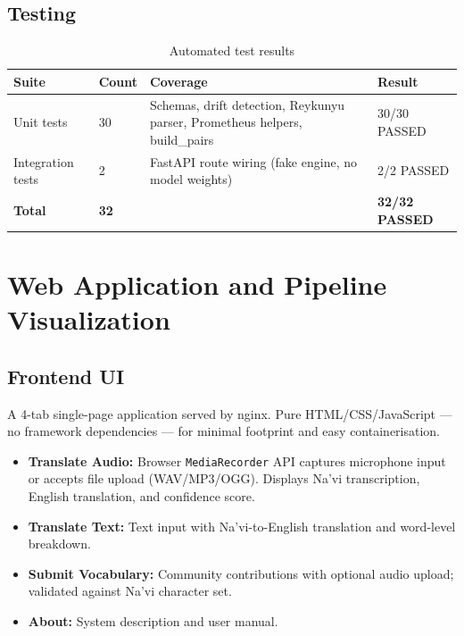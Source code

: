 \documentclass[12pt,a4paper]{article}
\begin{document}
\subsection{Testing}

\begin{table}[H]
  \centering
  \caption{Automated test results}
  \begin{tabular}{@{}L{3.5cm}C{1.5cm}L{6.5cm}C{2.5cm}@{}}
    \toprule
    \textbf{Suite} & \textbf{Count} & \textbf{Coverage} & \textbf{Result} \\
    \midrule
    Unit tests        & 30 & Schemas, drift detection, Reykunyu parser, Prometheus helpers, build\_pairs & 30/30 PASSED \\
    Integration tests & 2  & FastAPI route wiring (fake engine, no model weights) & 2/2 PASSED \\
    \midrule
    \textbf{Total}    & \textbf{32} & & \textbf{32/32 PASSED} \\
    \bottomrule
  \end{tabular}
\end{table}

\section{Web Application and Pipeline Visualization}

\subsection{Frontend UI}

A 4-tab single-page application served by nginx. Pure HTML/CSS/JavaScript ---
no framework dependencies --- for minimal footprint and easy containerisation.

\begin{itemize}[leftmargin=1.5em]
  \item \textbf{Translate Audio:} Browser \texttt{MediaRecorder} API captures microphone input or accepts file upload (WAV/MP3/OGG). Displays Na'vi transcription, English translation, and confidence score.
  \item \textbf{Translate Text:} Text input with Na'vi-to-English translation and word-level breakdown.
  \item \textbf{Submit Vocabulary:} Community contributions with optional audio upload; validated against Na'vi character set.
  \item \textbf{About:} System description and user manual.
\end{itemize}
\end{document}
